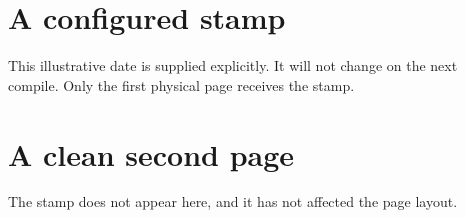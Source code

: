 \documentclass[11pt]{article}
\begin{document}
\section*{A configured stamp}
This illustrative date is supplied explicitly. It will not change on the
next compile. Only the first physical page receives the stamp.
\newpage
\section*{A clean second page}
The stamp does not appear here, and it has not affected the page layout.
\end{document}
